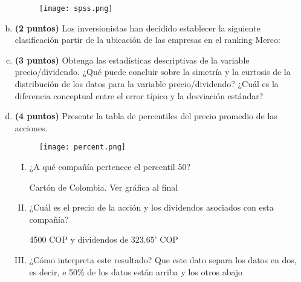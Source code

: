 \documentclass[../main.tex]{subfiles}
\begin{document}
\begin{enumerate}[(a)]
\begin{figure}[h]
\centering
\texttt{[image: spss.png]}
\label{fig:img1}
\end{figure}

\item \textbf{(2 puntos)} Los inversionistas han decidido establecer la siguiente clasificación partir de la ubicación de las empresas en el ranking Merco:

\item \textbf{(3 puntos)} Obtenga las estadísticas descriptivas de la variable precio/dividendo. ¿Qué puede concluir sobre la simetría y la curtosis de la distribución de los datos para la variable
precio/dividendo? ¿Cuál es la diferencia conceptual entre el error típico y la desviación
estándar?

\item \textbf{(4 puntos)} Presente la tabla de percentiles del precio promedio de las acciones.


\begin{figure}[h]
\centering
\texttt{[image: percent.png]}
\label{fig:img1}
\end{figure}

\pagebreak

\begin{enumerate}[(I)]

\item ¿A qué compañía pertenece el percentil 50?

Cartón de Colombia. Ver gráfica al final

\item ¿Cuál es el precio de la acción y los dividendos asociados con esta compañía?

4500 COP y dividendos de 323.65' COP

\item ¿Cómo interpreta este resultado?
 Que este dato separa los datos en dos, es decir, e 50\% de los datos están arriba y los otros abajo

\end{enumerate}

\end{enumerate}
\end{document}
